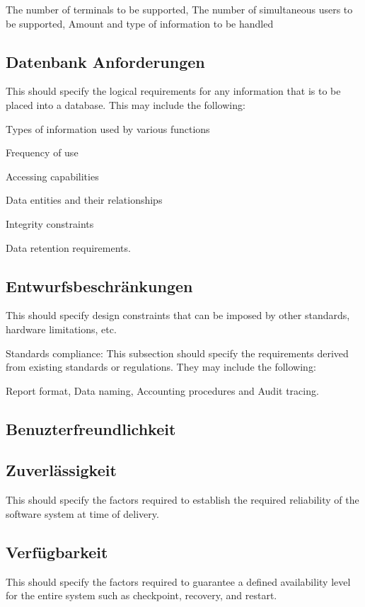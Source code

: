 {		The number of terminals to be supported, The number of simultaneous users to be supported, Amount and type of information to be handled
		
	\subsection{Datenbank Anforderungen}
		This should specify the logical requirements for any information that is to be placed into a database. This may include the following:
		
		Types of information used by various functions
		
		Frequency of use
		
		Accessing capabilities
		
		Data entities and their relationships
		
		Integrity constraints
		
		Data retention requirements.
	
	\subsection{Entwurfsbeschränkungen}
		This should specify design constraints that can be imposed by other standards, hardware limitations, etc.
		
		Standards compliance: This subsection should specify the requirements derived from existing standards or regulations. They may include the following: 
		
		Report format, Data naming, Accounting procedures and Audit tracing.
	
	\subsection{Benuzterfreundlichkeit}

	\subsection{Zuverlässigkeit}
		This should specify the factors required to establish the required reliability of the software system at time of delivery.
	
	\subsection{Verfügbarkeit}
		This should specify the factors required to guarantee a defined availability level for the entire system such as checkpoint, recovery, and restart. 
	
}
